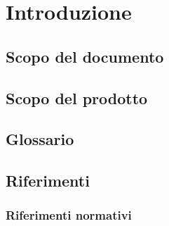 \documentclass[StudioDiFattibilità.tex]{subfiles}
\begin{document}
\chapter{Introduzione}
\section{Scopo del documento}
\section{Scopo del prodotto}
\section{Glossario}
\section{Riferimenti}
\subsection{Riferimenti normativi}
\end{document}
